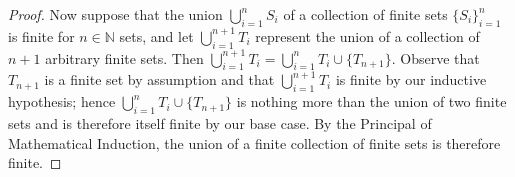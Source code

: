 \begin{proof}
    Now suppose that the union $\bigcup\limits_{i=1}^{n}{S_i}$ of a collection of finite sets $\{S_i\}_{i=1}^{n}$ 
    is finite for $n \in \mathbb{N}$ sets, and let $\bigcup\limits_{i=1}^{n+1}{T_i}$ represent the union of a collection
    of $n+1$ arbitrary finite sets. Then
    $\bigcup\limits_{i=1}^{n+1}{T_i} = \bigcup\limits_{i=1}^{n}{T_i} \cup \{T_{n+1}\}$.  Observe that $T_{n+1}$ is a
    finite set by assumption and that $\bigcup\limits_{i=1}^{n+1}{T_i}$ is finite by our
    inductive hypothesis; hence $\bigcup\limits_{i=1}^{n}{T_i} \cup \{T_{n+1}\}$ is nothing more than the union of two
    finite sets and is therefore itself finite by our base case. By the Principal of Mathematical Induction,
    the union of a finite collection of finite sets is therefore finite.

\end{proof}